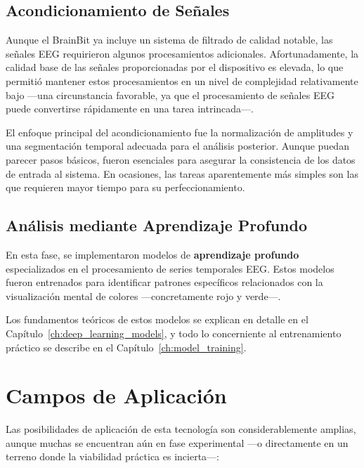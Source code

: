     \subsection{Acondicionamiento de Señales}
    Aunque el BrainBit ya incluye un sistema de filtrado de calidad notable, las señales EEG requirieron algunos procesamientos adicionales. Afortunadamente, la calidad base de las señales proporcionadas por el dispositivo es elevada, lo que permitió mantener estos procesamientos en un nivel de complejidad relativamente bajo —una circunstancia favorable, ya que el procesamiento de señales EEG puede convertirse rápidamente en una tarea intrincada—.
    
    El enfoque principal del acondicionamiento fue la normalización de amplitudes y una segmentación temporal adecuada para el análisis posterior. Aunque puedan parecer pasos básicos, fueron esenciales para asegurar la consistencia de los datos de entrada al sistema. En ocasiones, las tareas aparentemente más simples son las que requieren mayor tiempo para su perfeccionamiento.

    \subsection{Análisis mediante Aprendizaje Profundo}
    En esta fase, se implementaron modelos de \textbf{aprendizaje profundo} especializados en el procesamiento de series temporales EEG. Estos modelos fueron entrenados para identificar patrones específicos relacionados con la visualización mental de colores —concretamente rojo y verde—.
    
    Los fundamentos teóricos de estos modelos se explican en detalle en el Capítulo~\ref{ch:deep_learning_models}, y todo lo concerniente al entrenamiento práctico se describe en el Capítulo~\ref{ch:model_training}.

\section{Campos de Aplicación}
Las posibilidades de aplicación de esta tecnología son considerablemente amplias, aunque muchas se encuentran aún en fase experimental —o directamente en un terreno donde la viabilidad práctica es incierta—:

